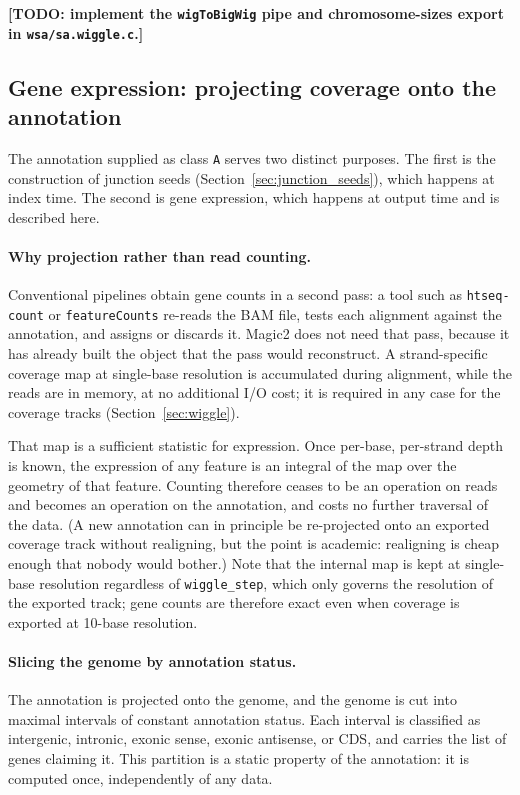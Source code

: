 \documentclass[11pt]{article}
\begin{document}
\textbf{[TODO: implement the \texttt{wigToBigWig} pipe and
chromosome-sizes export in \texttt{wsa/sa.wiggle.c}.]}

\subsection{Gene expression: projecting coverage onto the annotation}
\label{sec:gene_expression}

The annotation supplied as class \texttt{A} serves two distinct
purposes.
The first is the construction of junction seeds
(Section~\ref{sec:junction_seeds}), which happens at index time.
The second is gene expression, which happens at output time and is
described here.

\paragraph{Why projection rather than read counting.}
Conventional pipelines obtain gene counts in a second pass: a tool such
as \texttt{htseq-count} or \texttt{featureCounts} re-reads the BAM file,
tests each alignment against the annotation, and assigns or discards it.
Magic2 does not need that pass, because it has already built the object
that the pass would reconstruct.
A strand-specific coverage map at single-base resolution is accumulated
during alignment, while the reads are in memory, at no additional I/O
cost; it is required in any case for the coverage tracks
(Section~\ref{sec:wiggle}).

That map is a sufficient statistic for expression.
Once per-base, per-strand depth is known, the expression of any feature
is an integral of the map over the geometry of that feature.
Counting therefore ceases to be an operation on reads and becomes an
operation on the annotation, and costs no further traversal of the data.
(A new annotation can in principle be re-projected onto an exported
coverage track without realigning, but the point is academic: realigning
is cheap enough that nobody would bother.)
Note that the internal map is kept at single-base resolution regardless
of \texttt{wiggle\_step}, which only governs the resolution of the
exported track; gene counts are therefore exact even when coverage is
exported at 10-base resolution.

\paragraph{Slicing the genome by annotation status.}
The annotation is projected onto the genome, and the genome is cut into
maximal intervals of constant annotation status.
Each interval is classified as intergenic, intronic, exonic sense,
exonic antisense, or CDS, and carries the list of genes claiming it.
This partition is a static property of the annotation: it is computed
once, independently of any data.
\end{document}

